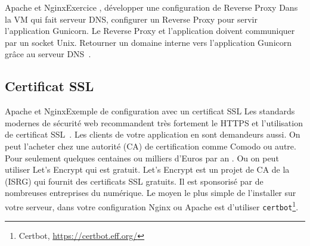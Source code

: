 \documentclass{beamer}
\begin{document}
    \begin{frame}{Apache et Nginx}{Exercice \execcounterdispinc{}, développer une configuration de Reverse Proxy}
        Dans la VM qui fait serveur DNS, configurer un Reverse Proxy pour servir l'application Gunicorn.
        Le Reverse Proxy et l'application doivent communiquer par un socket Unix.
        Retourner un domaine interne vers l'application Gunicorn grâce au serveur DNS~.
    \end{frame}

    \subsection{Certificat SSL}\label{subsec:certificat-ssl}
    \begin{frame}{Apache et Nginx}{Exemple de configuration avec un certificat SSL}
        Les standards modernes de sécurité web recommandent très fortement le HTTPS et l'utilisation de certificat SSL~.
        Les clients de votre application en sont demandeurs aussi.
        \bigbreak
        On peut l'acheter chez une autorité (CA) de certification comme Comodo ou autre.
        Pour seulement quelques centaines ou milliers d'Euros par an .
        Ou on peut utiliser Let's Encrypt qui est gratuit.
        \bigbreak
        Let's Encrypt est un projet de CA de la  (ISRG) qui fournit des certificats SSL gratuits.
        Il est sponsorisé par de nombreuses entreprises du numérique.
        \bigbreak
        Le moyen le plus simple de l'installer sur votre serveur, dans votre configuration Nginx ou Apache est d'utiliser \lstinline{certbot}\footnote{Certbot, \url{https://certbot.eff.org/}}.
    \end{frame}
\end{document}
